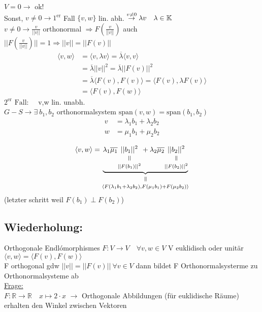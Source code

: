 \documentclass[titlepage,12pt,a4paper,ngerman]{report}
\newcommand{\verteq}{\rotatebox{90}{$\,=$}}
\newcommand{\equalto}[2]{\underset{\scriptstyle\overset{\mkern4mu\verteq}{#2}}{#1}}
\newcommand{\tx}[1]{\textrm{#1}}
\newcommand{\ub}[1]{\underbrace{#1}}
\newcommand{\spa}{\tx{span}}
\newcommand{\ska}[2]{\langle #1 , #2 \rangle}
\begin{document}
$ V = 0 \rightarrow $ ok!\\
Sonst, $ v \neq 0 \rightarrow 1^{\tx{er}} $ Fall $ \{v,w\} $ lin. abh. $ \buildrel v \neq 0 \over \rightarrow \lambda v \quad \lambda \in \mathbb{K} $ \\
$ v \neq 0 \rightarrow \frac{v}{||v||} $ orthonormal $ \Rightarrow F(\frac{v}{||v||}) $ auch\\
$ || F(\frac{v}{||v||})|| = 1 \Rightarrow ||v|| = ||F(v)||$
\begin{align*}
\ska{v}{w} &= \ska{v}{\lambda v} = \overline{\lambda} \ska{v}{v}\\
&= \overline{\lambda} ||v||^2 = \overline{\lambda} ||F(v)||^2\\ 
&= \overline{\lambda} \ska{F(v)}{F(v)} = \ska{F(v)}{\lambda F(v)}\\
&= \ska{F(v)}{F(w)}
\end{align*}
$\boxed{2^{\tx{er}} \tx{ Fall:}} \quad $  v,w lin. unabh.\\[5pt]
$ G - S \rightarrow \exists \ b_1, b_2 $ orthonormalsystem $ \spa(v,w) = \spa(b_1, b_2) $
\begin{align*}
v &= \lambda_1 b_1 + \lambda_2 b_2\\
w &= \mu_1 b_1 + \mu_2 b_2
\end{align*}

\begin{equation*}
\ska{v}{w} = \equalto{\ub{ \lambda_1 \overline{\mu_1} \equalto{||b_1||^2}{||F(b_1)||^2} + \lambda_2 \overline{\mu_2} \equalto{||b_2||^2}{||F(b_2)||^2}} }{\ska{F(\lambda_1 b_1 + \lambda_2 b_2)}{F(\mu_1 b_1 ) + F(\mu_2 b_2)}}
\end{equation*}
(letzter schritt weil $ F(b_1) \perp F(b_2) $) 


\subsection{Wiederholung:}
Orthogonale Endlómorphismes $ F: V \to V \quad \forall v,w \in V$ V euklidisch oder unitär \\
$ \ska{v}{w} = \ska{F(v)}{F(w)} $\\
F orthogonal gdw $ ||v|| = ||F(v) || \  \forall v \in V $ dann bildet F Orthonormalsysterme zu Orthonormalsysteme ab \\
\underline{Frage:}\\
$ F: \mathbb{R} \to \mathbb{R}\quad x \mapsto 2 \cdot x $
$ \rightarrow $ Orthogonale Abbildungen (für euklidische Räume) erhalten den Winkel zwischen Vektoren
\end{document}
